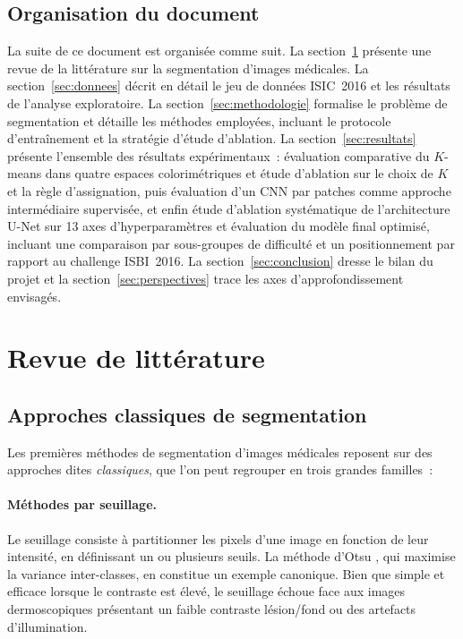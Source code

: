\documentclass[12pt,a4paper]{article}
\begin{document}
\subsection{Organisation du document}

La suite de ce document est organisée comme suit. La section~\ref{sec:revue} présente une revue de la littérature sur la segmentation d'images médicales. La section~\ref{sec:donnees} décrit en détail le jeu de données ISIC~2016 et les résultats de l'analyse exploratoire. La section~\ref{sec:methodologie} formalise le problème de segmentation et détaille les méthodes employées, incluant le protocole d'entraînement et la stratégie d'étude d'ablation. La section~\ref{sec:resultats} présente l'ensemble des résultats expérimentaux~: évaluation comparative du $K$-means dans quatre espaces colorimétriques et étude d'ablation sur le choix de $K$ et la règle d'assignation, puis évaluation d'un CNN par patches comme approche intermédiaire supervisée, et enfin étude d'ablation systématique de l'architecture U-Net sur 13 axes d'hyperparamètres et évaluation du modèle final optimisé, incluant une comparaison par sous-groupes de difficulté et un positionnement par rapport au challenge ISBI~2016. La section~\ref{sec:conclusion} dresse le bilan du projet et la section~\ref{sec:perspectives} trace les axes d'approfondissement envisagés.


\section{Revue de littérature}
\label{sec:revue}

\subsection{Approches classiques de segmentation}

Les premières méthodes de segmentation d'images médicales reposent sur des approches dites \emph{classiques}, que l'on peut regrouper en trois grandes familles~:

\paragraph{Méthodes par seuillage.} Le seuillage consiste à partitionner les pixels d'une image en fonction de leur intensité, en définissant un ou plusieurs seuils. La méthode d'Otsu \citep{otsu1979threshold}, qui maximise la variance inter-classes, en constitue un exemple canonique. Bien que simple et efficace lorsque le contraste est élevé, le seuillage échoue face aux images dermoscopiques présentant un faible contraste lésion/fond ou des artefacts d'illumination.
\end{document}
